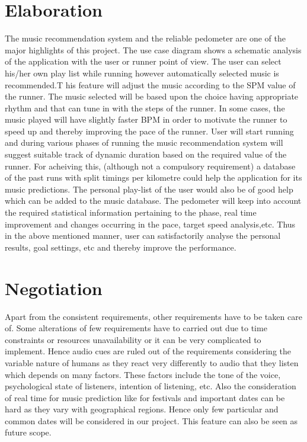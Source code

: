 \documentclass[10pt, a4paper]{article}
\begin{document}
\section*{Elaboration}
The music recommendation system and the reliable pedometer are one of the major highlights of this project.
The use case diagram shows a schematic analysis of the application with the user or runner point of view. The user can select his/her own play list while running however automatically selected music is recommended.T his feature will adjust the music according to the SPM value of the runner. The music selected will be based upon the choice having appropriate rhythm and that can tune in with the steps of the runner. In some cases, the music played will have slightly faster BPM in order to motivate the runner to speed up and thereby improving the pace of the runner. User will start running and during various phases of running the music recommendation system will suggest suitable track of dynamic duration based on the required value of the runner. For
acheiving this, (although not a compulsory requirement) a database of the past runs with split timings per kilometre
could help the application for its music predictions. The personal play-list of the user would also be of good
help which can be added to the music database.
The pedometer will keep into account the required statistical information pertaining to the phase, real time improvement
and changes occurring in the pace, target speed analysis,etc. Thus in the above mentioned manner, user can satisfactorily analyse the personal results, goal settings, etc and thereby improve the performance.

\section*{Negotiation}
Apart from the consistent requirements, other requirements have to be taken care of. Some alterations of few requirements have to carried out due to time constraints or resources unavailability or it can be very complicated to implement. Hence audio cues are ruled out of the requirements considering the variable nature of humans as they react very differently to audio that they listen which depends on many factors. These factors include the tone of the voice, psychological state of listeners, intention of listening, etc. Also the consideration of real time for music prediction like for festivals and important dates can be hard as they vary with geographical regions. Hence only few particular and common dates will be considered in our project. This feature can also be seen as future scope.     
\end{document}
